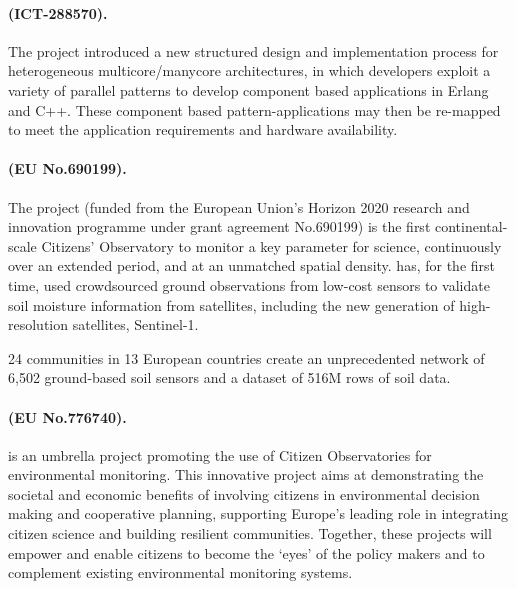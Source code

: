 \documentclass[a4paper,11pt]{article}
\begin{document}

\begin{mdframed}[backgroundcolor=blue!5]
\paragraph{\paraphrase (ICT-288570).}
The \paraphrase project introduced a new structured design and implementation process for
heterogeneous multicore/manycore architectures, in which developers exploit a variety of
parallel patterns to develop component based applications in Erlang and C++. These
component based pattern-applications may then be re-mapped to meet the
application requirements and hardware availability. 
\end{mdframed}

\begin{mdframed}[backgroundcolor=blue!5]
\paragraph{\grow (EU No.690199).}
The \grow project (funded from the European Union’s Horizon 2020 research and innovation programme under grant agreement No.690199) is the first continental-scale Citizens’ Observatory to monitor a key parameter for science, continuously over an extended period, and at an unmatched spatial density. \grow has, for the first time, used crowdsourced ground observations from low-cost sensors to validate soil moisture information from satellites, including the new generation of high-resolution satellites, Sentinel-1.

24 \grow communities in 13 European countries create an unprecedented network of 6,502 ground-based soil sensors and a dataset of 516M rows of soil data. 
\end{mdframed}

\begin{mdframed}[backgroundcolor=blue!5]
\paragraph{\weobserve (EU No.776740).}
\weobserve is an umbrella project promoting the use of Citizen Observatories for environmental monitoring.  This innovative project aims at demonstrating the societal and economic benefits of involving citizens in environmental decision making and cooperative planning, supporting Europe’s leading role in integrating citizen science and building resilient communities. Together, these projects will empower and enable citizens to become the ‘eyes’ of the policy makers and to complement existing environmental monitoring systems.
\end{mdframed}
\end{document}
